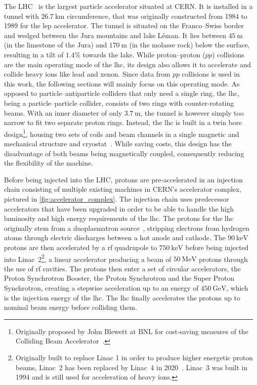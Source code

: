 The LHC~\cite{Bruning:782076} is the largest particle accelerator situated at CERN. It is installed in a tunnel with $\SI{26.7}{\km}$ circumference, that was originally constructed from 1984 to 1989 for the \gls{lep} accelerator. The tunnel is situated on the Franco--Swiss border and wedged between the Jura mountains and lake Léman. It lies between $\SI{45}{\meter}$ (in the limestone of the Jura) and $\SI{170}{\meter}$ (in the molasse rock) below the surface, resulting in a tilt of $1.4\%$ towards the lake.  While proton--proton ($pp$) collisions are the main operating mode of the \gls{lhc}, its design also allows it to accelerate and collide heavy ions like lead and xenon. Since data from $pp$ collisions is used in this work, the following sections will mainly focus on this operating mode. As opposed to particle--antiparticle colliders that only need a single ring, the \gls{lhc}, being a particle--particle collider, consists of two rings with counter-rotating beams. With an inner diameter of only $\SI{3.7}{\meter}$, the tunnel is however simply too narrow to fit two separate proton rings. Instead, the \gls{lhc} is built in a twin bore design\footnote{Originally proposed by John Blewett at BNL for cost-saving measures of the Colliding Beam Accelerator~\cite{blewett1971proceedings,Evans:1129806}.}, housing two sets of coils and beam channels in a single magnetic and mechanical structure and cryostat~\cite{Bruning:782076}. While saving costs, this design has the disadvantage of both beams being magnetically coupled, consequently reducing the flexibility of the machine. 

Before being injected into the LHC, protons are pre-accelerated in an injection chain consisting of multiple existing machines in CERN's accelerator complex, pictured in \cref{fig:accelerator_complex}. The injection chain uses predecessor accelerators that have been upgraded in order to be able to handle the high luminosity and high energy requirements of the \gls{lhc}. The protons for the \gls{lhc} originally stem from a duoplasmatron source~\cite{Scrivens:1382102}, stripping electrons from hydrogen atoms through electric discharges between a hot anode and cathode. The $\SI{90}{\keV}$ protons are then accelerated by a \gls{rf} quadrupole to $\SI{750}{\keV}$ before being injected into Linac~2\footnote{Originally built to replace Linac 1 in order to produce higher energetic proton beams, Linac~2 has been replaced by Linac~4 in 2020~\cite{linac4:2736208}. Linac~3 was built in 1994 and is still used for acceleration of heavy ions.}, a linear accelerator producing a beam of $\SI{50}{\MeV}$ protons through the use of \gls{rf} cavities. The protons then enter a set of circular accelerators, the Proton Synchrotron Booster, the Proton Synchrotron and the Super Proton Synchrotron, creating a stepwise acceleration up to an energy of $\SI{450}{\GeV}$, which is the injection energy of the \gls{lhc}. The \gls{lhc} finally accelerates the protons up to nominal beam energy before colliding them. 

